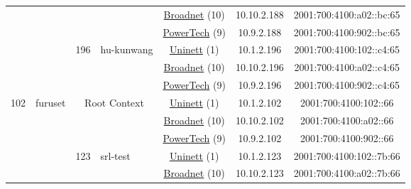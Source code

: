 \begin{small}
\begin{center}
\begin{longtable}{|c|c|c|c|c|c|c|c|}
  &  &  &  & \multicolumn{2}{|c|}{\tiny{\href{https://www.broadnet.no}{Broadnet} (10)}} & \tiny{10.10.2.188} & \tiny{2001:700:4100:a02::bc:65} \\* \cline{5-5}\cline{6-6}\cline{7-7}\cline{8-8}
  &  &  &  & \multicolumn{2}{|c|}{\tiny{\href{http://www.powertech.no}{PowerTech} (9)}} & \tiny{10.9.2.188} & \tiny{2001:700:4100:902::bc:65} \\* \cline{3-3}\cline{4-4}\cline{5-5}\cline{6-6}\cline{7-7}\cline{8-8}
  &  & \multirow{3}{*}{\tiny{196}} & \multicolumn{1}{|l|}{\multirow{3}{*}{\tiny{hu-kunwang}}} & \multicolumn{2}{|c|}{\tiny{\href{https://www.uninett.no}{Uninett} (1)}} & \tiny{10.1.2.196} & \tiny{2001:700:4100:102::c4:65} \\* \cline{5-5}\cline{6-6}\cline{7-7}\cline{8-8}
  &  &  &  & \multicolumn{2}{|c|}{\tiny{\href{https://www.broadnet.no}{Broadnet} (10)}} & \tiny{10.10.2.196} & \tiny{2001:700:4100:a02::c4:65} \\* \cline{5-5}\cline{6-6}\cline{7-7}\cline{8-8}
  &  &  &  & \multicolumn{2}{|c|}{\tiny{\href{http://www.powertech.no}{PowerTech} (9)}} & \tiny{10.9.2.196} & \tiny{2001:700:4100:902::c4:65} \\ \hline
 \multirow{48}{*}{\tiny{102}} & \multicolumn{1}{|l|}{\multirow{48}{*}{\tiny{furuset}}} & \multicolumn{2}{|c|}{\multirow{3}{*}{\tiny{Root Context}}} & \multicolumn{2}{|c|}{\tiny{\href{https://www.uninett.no}{Uninett} (1)}} & \tiny{10.1.2.102} & \tiny{2001:700:4100:102::66} \\* \cline{5-5}\cline{6-6}\cline{7-7}\cline{8-8}
  &  & \multicolumn{2}{|c|}{} & \multicolumn{2}{|c|}{\tiny{\href{https://www.broadnet.no}{Broadnet} (10)}} & \tiny{10.10.2.102} & \tiny{2001:700:4100:a02::66} \\* \cline{5-5}\cline{6-6}\cline{7-7}\cline{8-8}
  &  & \multicolumn{2}{|c|}{} & \multicolumn{2}{|c|}{\tiny{\href{http://www.powertech.no}{PowerTech} (9)}} & \tiny{10.9.2.102} & \tiny{2001:700:4100:902::66} \\* \cline{3-3}\cline{4-4}\cline{5-5}\cline{6-6}\cline{7-7}\cline{8-8}
  &  & \multirow{3}{*}{\tiny{123}} & \multicolumn{1}{|l|}{\multirow{3}{*}{\tiny{srl-test}}} & \multicolumn{2}{|c|}{\tiny{\href{https://www.uninett.no}{Uninett} (1)}} & \tiny{10.1.2.123} & \tiny{2001:700:4100:102::7b:66} \\* \cline{5-5}\cline{6-6}\cline{7-7}\cline{8-8}
  &  &  &  & \multicolumn{2}{|c|}{\tiny{\href{https://www.broadnet.no}{Broadnet} (10)}} & \tiny{10.10.2.123} & \tiny{2001:700:4100:a02::7b:66} \\* \cline{5-5}\cline{6-6}\cline{7-7}\cline{8-8}

\end{longtable}
\end{center}
\end{small}
